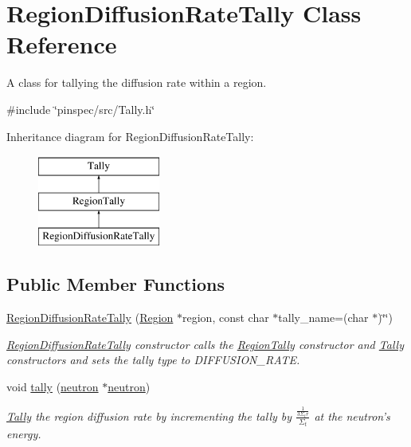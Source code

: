 \hypertarget{classRegionDiffusionRateTally}{\section{Region\-Diffusion\-Rate\-Tally Class Reference}
\label{classRegionDiffusionRateTally}
}


A class for tallying the diffusion rate within a region.  




{\ttfamily \#include \char`\"{}pinspec/src/\-Tally.\-h\char`\"{}}

Inheritance diagram for Region\-Diffusion\-Rate\-Tally\-:\begin{figure}[H]
\begin{center}
\leavevmode
\includegraphics[height=3.000000cm]{classRegionDiffusionRateTally}
\end{center}
\end{figure}
\subsection*{Public Member Functions}
\begin{DoxyCompactItemize}
\item 
\hyperlink{classRegionDiffusionRateTally_a64dc61a22189a60f052cf349615d3463}{Region\-Diffusion\-Rate\-Tally} (\hyperlink{classRegion}{Region} $\ast$region, const char $\ast$tally\-\_\-name=(char $\ast$)\char`\"{}\char`\"{})
\begin{DoxyCompactList}\small\item\em \hyperlink{classRegionDiffusionRateTally}{Region\-Diffusion\-Rate\-Tally} constructor calls the \hyperlink{classRegionTally}{Region\-Tally} constructor and \hyperlink{classTally}{Tally} constructors and sets the tally type to D\-I\-F\-F\-U\-S\-I\-O\-N\-\_\-\-R\-A\-T\-E. \end{DoxyCompactList}\item 
void \hyperlink{classRegionDiffusionRateTally_a0c581304fc724c57632ed00b5f2e5e0f}{tally} (\hyperlink{structneutron}{neutron} $\ast$\hyperlink{structneutron}{neutron})
\begin{DoxyCompactList}\small\item\em \hyperlink{classTally}{Tally} the region diffusion rate by incrementing the tally by $ \frac{\frac{1}{3\Sigma_tr}}{\Sigma_t} $ at the neutron's energy. \end{DoxyCompactList}\end{DoxyCompactItemize}

